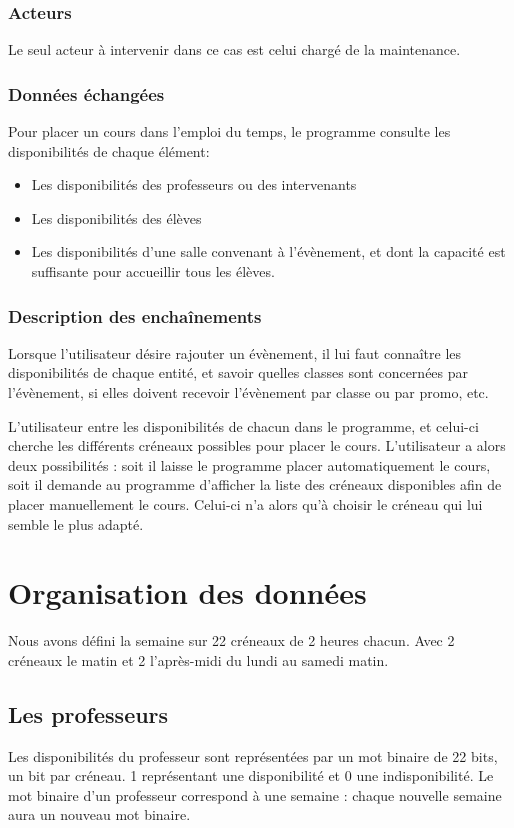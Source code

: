 \documentclass[12pt,a4paper,french]{article}
\newcounter{subsubsubsection}
\begin{document}
\subsubsection{Acteurs}
Le seul acteur à intervenir dans ce cas est celui chargé de la maintenance.
            
\subsubsection{Données échangées}
Pour placer un cours dans l'emploi du temps, le programme consulte les disponibilités de chaque élément:

\begin{itemize}
\item Les disponibilités des professeurs ou des intervenants
\item Les disponibilités des élèves
\item Les disponibilités d'une salle convenant à l'évènement, et dont la capacité est suffisante pour accueillir tous les élèves.
\end{itemize}
                
\subsubsection{Description des enchaînements}        
Lorsque l'utilisateur désire rajouter un évènement, il lui faut connaître les disponibilités de chaque entité, et savoir quelles classes sont concernées par l'évènement, si elles doivent recevoir l'évènement par classe ou par promo, etc.

L'utilisateur entre les disponibilités de chacun dans le programme, et celui-ci cherche les différents créneaux possibles pour placer le cours. L'utilisateur a alors deux possibilités : soit il laisse le programme placer automatiquement le cours, soit il demande au programme d'afficher la liste des créneaux disponibles afin de placer manuellement le cours. Celui-ci n'a alors qu'à choisir le créneau qui lui semble le plus adapté.

\newpage
\section{Organisation des données}
Nous avons défini la semaine sur 22 créneaux de 2 heures chacun. Avec 2 créneaux le matin et 2 l'après-midi du lundi au samedi matin.

\subsection{Les professeurs}
Les disponibilités du professeur sont représentées par un mot binaire de 22 bits, un bit par créneau. 1 représentant une disponibilité et 0 une indisponibilité.
Le mot binaire d'un professeur correspond à une semaine : chaque nouvelle semaine aura un nouveau mot binaire.
\end{document}
